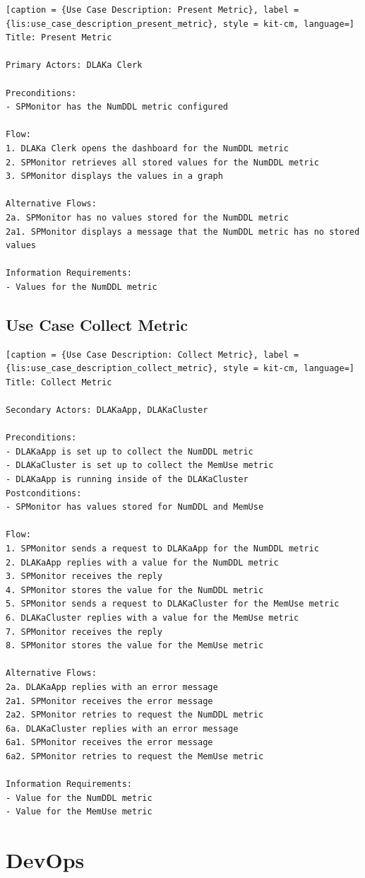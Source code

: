 \begin{lstlisting}[caption = {Use Case Description: Present Metric}, label = {lis:use_case_description_present_metric}, style = kit-cm, language=] 
Title: Present Metric

Primary Actors: DLAKa Clerk

Preconditions:
- SPMonitor has the NumDDL metric configured

Flow:
1. DLAKa Clerk opens the dashboard for the NumDDL metric
2. SPMonitor retrieves all stored values for the NumDDL metric
3. SPMonitor displays the values in a graph

Alternative Flows:
2a. SPMonitor has no values stored for the NumDDL metric
2a1. SPMonitor displays a message that the NumDDL metric has no stored values

Information Requirements:
- Values for the NumDDL metric
\end{lstlisting}

\subsection{Use Case Collect Metric}

\begin{lstlisting}[caption = {Use Case Description: Collect Metric}, label = {lis:use_case_description_collect_metric}, style = kit-cm, language=] 
Title: Collect Metric

Secondary Actors: DLAKaApp, DLAKaCluster

Preconditions:
- DLAKaApp is set up to collect the NumDDL metric
- DLAKaCluster is set up to collect the MemUse metric
- DLAKaApp is running inside of the DLAKaCluster
Postconditions:
- SPMonitor has values stored for NumDDL and MemUse

Flow:
1. SPMonitor sends a request to DLAKaApp for the NumDDL metric
2. DLAKaApp replies with a value for the NumDDL metric
3. SPMonitor receives the reply
4. SPMonitor stores the value for the NumDDL metric
5. SPMonitor sends a request to DLAKaCluster for the MemUse metric
6. DLAKaCluster replies with a value for the MemUse metric
7. SPMonitor receives the reply
8. SPMonitor stores the value for the MemUse metric

Alternative Flows:
2a. DLAKaApp replies with an error message
2a1. SPMonitor receives the error message
2a2. SPMonitor retries to request the NumDDL metric
6a. DLAKaCluster replies with an error message
6a1. SPMonitor receives the error message
6a2. SPMonitor retries to request the MemUse metric

Information Requirements:
- Value for the NumDDL metric
- Value for the MemUse metric
\end{lstlisting}

\section{DevOps}